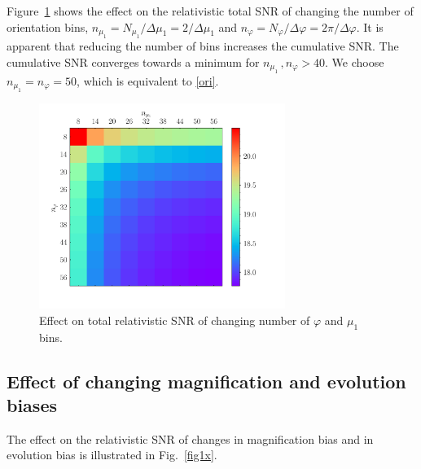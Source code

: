 Figure~\ref{fig4x} 
shows the effect on the 
relativistic 
total SNR of changing the number of orientation bins, $n_{\mu_1}=N_{\mu_1}/\Delta{\mu_1}=2 /\Delta{\mu_1}$  and $n_\varphi=N_\varphi/\Delta\varphi =2\pi/\Delta\varphi$. It is apparent 
that reducing the number of bins increases the cumulative SNR. The cumulative SNR 
converges towards a minimum for 
$n_{\mu_{1}}\,, n_{\varphi} > 40$.
We choose $n_{\mu_{1}}= n_{\varphi}=50$, which is equivalent to \eqref{ori}.
\begin{figure}[ht]
\centering
\includegraphics[width=8.0cm]{fig/colournmu1nphi_Doppler-eps-converted-to} 
\caption{Effect on 
{total} relativistic SNR of changing number of  $\varphi$ and $\mu_1$ bins. 
} \label{fig4x}
\end{figure} 


\subsection*{{Effect of changing magnification and evolution biases}}

The effect on the relativistic SNR of changes in magnification bias and in evolution bias is illustrated in Fig.~\ref{fig1x}.

